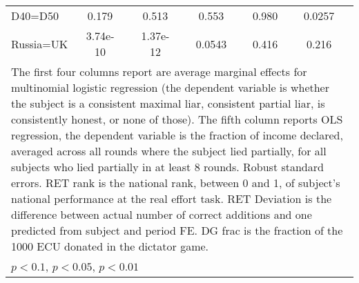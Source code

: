 \begin{tabular}{l|cccccccc|cc}
D40=D50         &    0.179         &         &    0.513         &         &    0.553         &         &    0.980         &         &   0.0257         &         \\
Russia=UK       & 3.74e-10         &         & 1.37e-12         &         &   0.0543         &         &    0.416         &         &    0.216         &         \\
\hline\hline
\multicolumn{11}{p{16.5cm}}{\tiny The first four columns report are average marginal effects for multinomial logistic regression (the dependent variable is whether the subject is a consistent maximal liar, consistent partial liar, is consistently honest, or none of those). The fifth column reports OLS regression, the dependent variable is the fraction of income declared, averaged across all rounds where the subject lied partially, for all subjects who lied partially in at least 8 rounds. Robust standard errors. RET rank is the national rank, between 0 and 1, of subject's national performance at the real effort task. RET Deviation is the difference between actual number of correct additions and one predicted from subject and period FE. DG frac is the fraction of the 1000 ECU donated in the dictator game.}\\
\multicolumn{11}{l}{\tiny \sym{*} \(p<0.1\), \sym{**} \(p<0.05\), \sym{***} \(p<0.01\)}\\
\end{tabular}